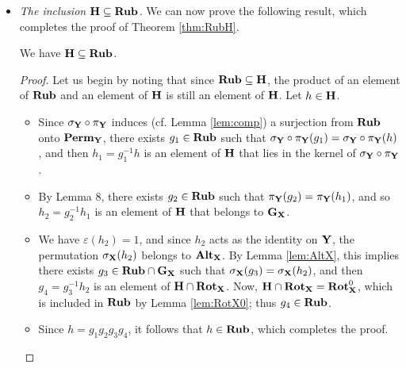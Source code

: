 \begin{itemize}
    \item \emph{The inclusion $\mathbf{H} \subseteq \mathbf{Rub}$.}
    We can now prove the following result, which completes the proof of Theorem \ref{thm:RubH}.
    \begin{proposition}
        \label{prop:HSubRub}
        We have $\mathbf{H} \subseteq \mathbf{Rub}$.
    \end{proposition}
    \begin{proof}
        Let us begin by noting that since $\mathbf{Rub} \subseteq \mathbf{H}$, the product of an element of $\mathbf{Rub}$ and an element of $\mathbf{H}$ is still an element of $\mathbf{H}$. Let $h \in \mathbf{H}$.
        \begin{itemize}
            \item Since $\sigma_{\mathbf{Y}} \circ \pi_{\mathbf{Y}}$ induces (cf. Lemma \ref{lem:comp}) a surjection from $\mathbf{Rub}$ onto $\mathbf{Perm}_{\mathbf{Y}}$, there exists $g_{1} \in \mathbf{Rub}$ such that $\sigma_{\mathbf{Y}} \circ \pi_{\mathbf{Y}}(g_{1}) = \sigma_{\mathbf{Y}} \circ \pi_{\mathbf{Y}}(h)$, and then $h_{1} = g_{1}^{-1} h$ is an element of $\mathbf{H}$ that lies in the kernel of $\sigma_{\mathbf{Y}} \circ \pi_{\mathbf{Y}}$.
            \item By Lemma 8, there exists $g_{2} \in \mathbf{Rub}$ such that $\pi_{\mathbf{Y}}(g_{2}) = \pi_{\mathbf{Y}}(h_{1})$, and so $h_{2} = g_{2}^{-1} h_{1}$ is an element of $\mathbf{H}$ that belongs to $\mathbf{G}_{\mathbf{X}}$.
            \item We have $\varepsilon(h_{2}) = 1$, and since $h_{2}$ acts as the identity on $\mathbf{Y}$, the permutation $\sigma_{\mathbf{X}}(h_{2})$ belongs to $\mathbf{Alt}_{\mathbf{X}}$.
            By Lemma \ref{lem:AltX}, this implies there exists $g_{3} \in \mathbf{Rub} \cap \mathbf{G}_{\mathbf{X}}$ such that $\sigma_{\mathbf{X}}(g_{3}) = \sigma_{\mathbf{X}}(h_{2})$, and then $g_{4} = g_{3}^{-1} h_{2}$ is an element of $\mathbf{H} \cap \mathbf{Rot}_{\mathbf{X}}$.
            Now, $\mathbf{H} \cap \mathbf{Rot}_{\mathbf{X}} = \mathbf{Rot}_{\mathbf{X}}^{0}$, which is included in $\mathbf{Rub}$ by Lemma \ref{lem:RotX0}; thus $g_{4} \in \mathbf{Rub}$.
            \item Since $h = g_{1} g_{2} g_{3} g_{4}$, it follows that $h \in \mathbf{Rub}$, which completes the proof.
        \end{itemize}
    \end{proof}
\end{itemize}




